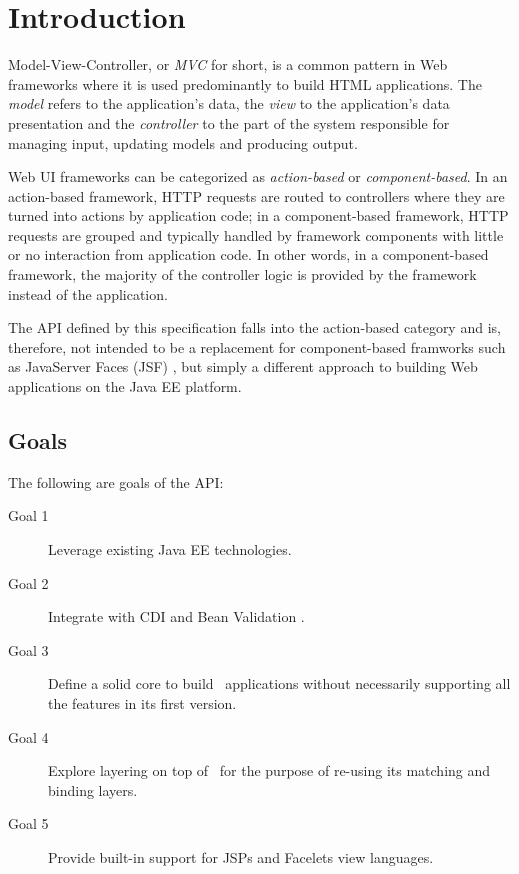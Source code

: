 \chapter{Introduction}

Model-View-Controller, or {\em MVC} for short, is a common pattern in Web frameworks 
where it is used predominantly to build HTML applications. The {\em model} refers to the 
application's data, the {\em view} to the application's data presentation and the 
{\em controller} to the part of the system responsible for managing input, updating models 
and producing output.

Web UI frameworks can be categorized as {\em action-based} or {\em component-based}. In an action-based 
framework, HTTP requests are routed to controllers where they are turned into actions by application code; 
in a component-based framework, HTTP requests are grouped and typically handled by framework components
with little or no interaction from application code. In other words, in a component-based framework,
the majority of the controller logic is provided by the framework instead of the application.

The API defined by this specification falls into the action-based 
category and is, therefore, not intended to be a replacement for component-based framworks such as
JavaServer Faces (JSF) \cite{jsf}, but simply a different approach to building Web applications on the 
Java EE platform.

\section{Goals}
\label{goals}

The following are goals of the API:

\begin{description}
\item[Goal 1] Leverage existing Java EE technologies. 
\item[Goal 2] Integrate with CDI \cite{cdi} and Bean Validation \cite{bv11}.
\item[Goal 3] Define a solid core to build \mvc\ applications without necessarily supporting all the 
features in its first version.
\item[Goal 4] Explore layering on top of \jaxrs\ for the purpose of re-using its
matching and binding layers.
\item[Goal 5] Provide built-in support for JSPs and Facelets view languages.
\end{description}

